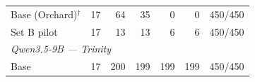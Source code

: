 \begin{table}[t]
{\begin{tabular}{lrrrrrr}
Base (Orchard)$^{\dagger}$ & 17 & 64 & 35 & 0 & 0 & 450/450 \\
Set B pilot & 17 & 13 & 13 & 6 & 6 & 450/450 \\
\midrule
\multicolumn{7}{l}{\textit{Qwen3.5-9B --- Trinity}} \\
Base & 17 & 200 & 199 & 199 & 199 & 450/450 \\

\end{tabular}}
\end{table}
